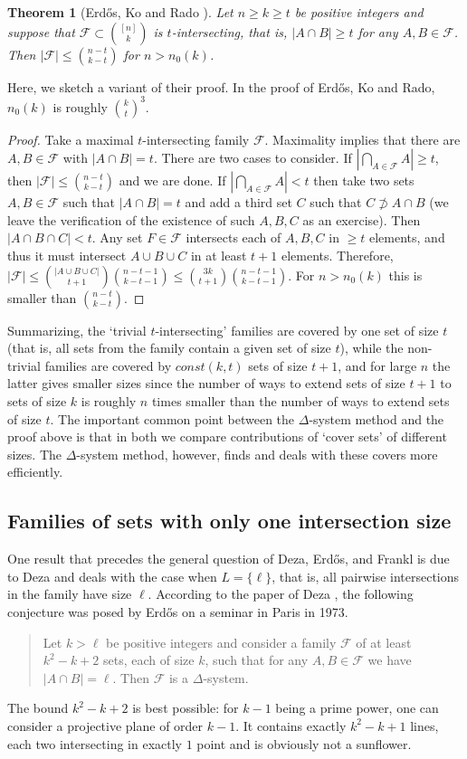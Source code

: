 \documentclass[graybox]{svmult}
\renewcommand{\le}{\leqslant}
\renewcommand{\ge}{\geqslant}
\newcommand{\ff}{\mathcal{F}}
\newtheorem{thm}{Theorem}
\begin{document}
\begin{thm}[Erd\H os, Ko and Rado \cite{EKR}] Let $n\ge k\ge t$ be positive integers and suppose that $\ff\subset {[n]\choose k}$ is $t$-intersecting, that is, $|A\cap B|\ge t$ for any $A,B\in \ff$. Then $|\ff|\le {n-t\choose k-t}$ for $n>n_0(k)$.
\end{thm}
Here, we sketch a variant of their proof. In the proof of Erd\H os, Ko and Rado, $n_0(k)$ is roughly ${k\choose t}^3$.
\begin{proof}
Take a maximal $t$-intersecting family $\ff$. Maximality implies that there are $A,B\in \ff$ with $|A\cap B|=t$. There are two cases to consider. If $|\bigcap_{A\in \ff} A|\ge t$, then $|\ff|\le {n-t\choose k-t}$ and we are done. If $|\bigcap_{A\in \ff} A|< t$ then take two sets $A,B\in\ff$ such that $|A\cap B|=t$ and add a third set $C$ such that $C\not\supset A\cap B$ (we leave the verification of the existence of such $A,B,C$ as an exercise). Then $|A\cap B\cap C|<t$. Any set $F\in \ff$ intersects each of $A,B,C$ in $\ge t$ elements, and thus it must intersect $A\cup B\cup C$ in at least $t+1$ elements. Therefore, $|\ff|\le {|A\cup B\cup C|\choose t+1}{n-t-1\choose k-t-1}\le {3k\choose t+1}{n-t-1\choose k-t-1}$. For $n>n_0(k)$ this is smaller than ${n-t\choose k-t}$.
\end{proof}

Summarizing, the `trivial $t$-intersecting' families are covered by one set of size $t$ (that is, all sets from the family contain a given set of size $t$), while the non-trivial families are covered by $const(k,t)$ sets of size $t+1$, and for large $n$ the latter gives smaller sizes since the number of ways to extend sets of size $t+1$ to sets of size $k$ is roughly $n$ times smaller than the number of ways to extend sets of size $t$. The important common point between the $\Delta$-system method and the proof above is that in both we compare contributions of `cover sets' of different sizes. The $\Delta$-system method, however, finds and deals with these covers more efficiently.


\subsection{Families of sets with only one intersection size}\label{sec22}
One result that precedes the general question of  Deza, Erd\H os,  and Frankl is due to Deza and deals with the case when $L = \{\ell\}$, that is, all pairwise intersections in the family have size $\ell$. According to the paper of Deza \cite{D1}, the following conjecture was posed by Erd\H os on a seminar in Paris in 1973.
\begin{quote}
  Let $k> \ell$ be positive integers and consider a family $\ff$ of at least $k^2-k+2$ sets, each of size $k$, such that for any $A,B\in \ff$ we have $|A\cap B|=\ell$. Then $\ff$ is a $\Delta$-system.
\end{quote}
The bound $k^2-k+2$ is best possible: for $k-1$ being a prime power, one can consider a projective plane of order $k-1$. It contains exactly $k^2-k+1$ lines, each two intersecting in exactly $1$ point and is obviously not a sunflower.
\end{document}
